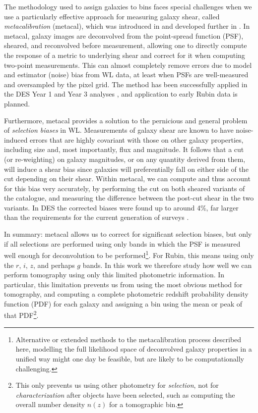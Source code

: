 \documentclass[twocolumn,twocolappendix]{aastex63}
\begin{document}
The methodology used to assign galaxies to bins faces special challenges when we use a particularly
effective approach for measuring galaxy shear, called \emph{metacalibration} (metacal),
which was introduced in \citet{sheldonhuff} and developed further in \citet{sheldon}.
In metacal, galaxy images are deconvolved from the point-spread function (PSF), sheared, and
reconvolved before measurement, allowing one to directly compute the response of a metric
to underlying shear and correct for it when computing two-point measurements.  This can
almost completely remove errors due to model and estimator (noise) bias from WL data, at least
when PSFs are well-measured and oversampled by the pixel grid.  The method has been successfully
applied in the DES Year 1 and Year 3 analyses \citep{des-y1-cat, des-y3-cat},
and application to early Rubin data is planned.

Furthermore, metacal provides a solution to the pernicious and general problem of
\emph{selection biases} in WL.  Measurements of galaxy shear are known to have noise-induced errors
that are
highly covariant with those on other galaxy properties, including size and, most importantly, flux and
magnitude.  It follows that a cut (or re-weighting) on galaxy magnitudes, or on any quantity derived
from  them, will induce a shear bias since galaxies will preferentially fall on either side of the cut
depending on their shear.  Within metacal, we can compute and thus account for this bias
very accurately, by performing the cut on both
sheared variants of the catalogue, and measuring the difference between the post-cut shear in the two
variants.  In DES the corrected biases were found up to around 4\%, far larger than
the requirements for the current generation of surveys \citep{des-y1-cat}.

In summary: metacal allows us to correct for significant selection biases, but only if all selections
are performed using only bands in which the PSF is measured well enough for deconvolution to be
performed\footnote{Alternative or extended methods to the metacalibration process described here, modelling the full likelihood space of deconvolved galaxy properties in a unified way might one day be feasible, but are likely to be computationally challenging.}.  For Rubin, this means using only the $r$, $i$, $z$, and perhaps $g$ bands.  In this work we
therefore study how well we can perform tomography using only this limited photometric information.  In
particular, this limitation prevents us from using the most obvious method for tomography,
and computing a complete photometric redshift probability density function (PDF) for each galaxy and assigning
a bin using the mean or peak of that PDF\footnote{This only prevents us using other photometry for \emph{selection}, not for \emph{characterization} after objects have been selected, such as computing the overall
number density $n(z)$ for a tomographic bin.}.
\end{document}
